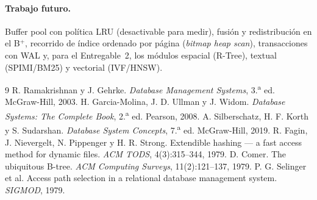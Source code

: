 \documentclass[11pt,a4paper]{article}
\begin{document}
\paragraph{Trabajo futuro.} Buffer pool con política LRU (desactivable para medir), fusión y
redistribución en el B$^+$, recorrido de índice ordenado por página (\emph{bitmap heap scan}),
transacciones con WAL y, para el Entregable~2, los módulos espacial (R-Tree), textual (SPIMI/BM25) y
vectorial (IVF/HNSW).

\begin{thebibliography}{9}
 R. Ramakrishnan y J. Gehrke. \emph{Database Management Systems}, 3.\textsuperscript{a} ed. McGraw-Hill, 2003.
 H. Garcia-Molina, J. D. Ullman y J. Widom. \emph{Database Systems: The Complete Book}, 2.\textsuperscript{a} ed. Pearson, 2008.
 A. Silberschatz, H. F. Korth y S. Sudarshan. \emph{Database System Concepts}, 7.\textsuperscript{a} ed. McGraw-Hill, 2019.
 R. Fagin, J. Nievergelt, N. Pippenger y H. R. Strong. Extendible hashing --- a fast access method for dynamic files. \emph{ACM TODS}, 4(3):315--344, 1979.
 D. Comer. The ubiquitous B-tree. \emph{ACM Computing Surveys}, 11(2):121--137, 1979.
 P. G. Selinger et al. Access path selection in a relational database management system. \emph{SIGMOD}, 1979.
\end{thebibliography}
\end{document}
